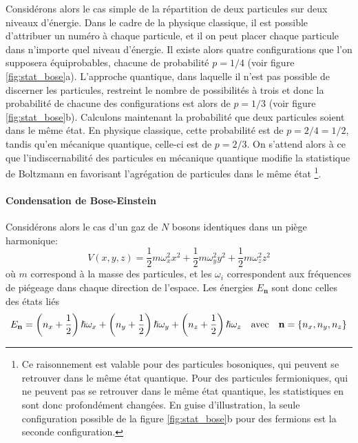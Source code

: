 Considérons alors le cas simple de la répartition de deux particules sur deux niveaux d'énergie. Dans le cadre de la physique classique, il est possible d'attribuer un numéro à chaque particule, et il on peut placer chaque particule dans n'importe quel niveau d'énergie. Il existe alors quatre configurations que l'on supposera équiprobables, chacune de probabilité $p=1/4$ (voir figure \ref{fig:stat_bose}a). L'approche quantique, dans laquelle il n'est pas possible de discerner les particules, restreint le nombre de possibilités à trois et donc la probabilité de chacune des configurations est alors de $p=1/3$ (voir figure \ref{fig:stat_bose}b). Calculons maintenant la probabilité que deux particules soient dans le même état. En physique classique, cette probabilité est de $p=2/4=1/2$, tandis qu'en mécanique quantique, celle-ci est de $p=2/3$. On s'attend alors à ce que l'indiscernabilité des particules en mécanique quantique modifie la statistique de Boltzmann en favorisant l'agrégation de particules dans le même état \footnote{Ce raisonnement est valable pour des particules bosoniques, qui peuvent se retrouver dans le même état quantique. Pour des particules fermioniques, qui ne peuvent pas se retrouver dans le même état quantique, les statistiques en sont donc profondément changées. En guise d'illustration, la seule configuration possible de la figure \ref{fig:stat_bose}b pour des fermions est la seconde configuration.}.

\paragraph*{Condensation de Bose-Einstein}
Considérons alors le cas d'un gaz de $N$ bosons identiques dans un piège harmonique:
\begin{equation}
V(x,y,z)=\frac{1}{2}m \omega_x^2 x^2 + \frac{1}{2}m \omega_y^2 y^2 + \frac{1}{2}m \omega_z^2 z^2
\end{equation}
où $m$ correspond à la masse des particules, et les $\omega_i$ correspondent aux fréquences de piégeage dans chaque direction de l'espace. Les énergies $E_{\mathbf{n}}$ sont donc celles des états liés
\begin{equation}
E_{\mathbf{n}}=\left(n_x+\frac{1}{2}\right) \hslash \omega_x + \left(n_y+\frac{1}{2}\right) \hslash \omega_y + \left(n_z+\frac{1}{2}\right) \hslash \omega_z \quad \text{avec}\quad \mathbf{n}=\lbrace n_x,n_y,n_z\rbrace
\end{equation}

